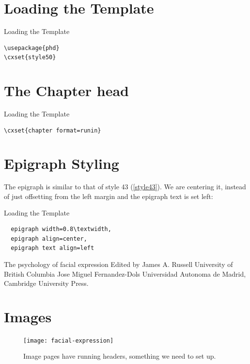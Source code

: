 \section{Loading the Template}

\begin{scriptexample}{Loading the Template}
\begin{verbatim}
\usepackage{phd}
\cxset{style50}
\end{verbatim}
\end{scriptexample}

\section{The Chapter head}
\begin{scriptexample}{Loading the Template}{}
\begin{verbatim}
\cxset{chapter format=runin}
\end{verbatim}
\end{scriptexample}

\section{Epigraph Styling}
The epigraph is similar to that of style 43 (\autoref{style43}). We are centering it, instead of just offsetting from the left margin and the epigraph text is set left:

\begin{scriptexample}{Loading the Template}
\begin{verbatim}
  epigraph width=0.8\textwidth,
  epigraph align=center,
  epigraph text align=left
\end{verbatim}
\end{scriptexample}




The psychology of facial
expression
Edited by
James A. Russell
University of British Columbia
Jose Miguel Fernandez-Dols
Universidad Autonoma de Madrid, Cambridge University Press.

\section{Images}

\begin{figure}[htbp]
\texttt{[image: facial-expression]}
\caption{Image pages have running headers, something we need to set up.}
\end{figure}



\makeatletter\@runinheadfalse\makeatother